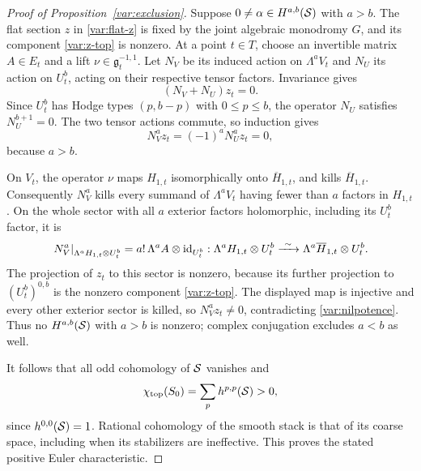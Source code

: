 \begin{proof}[Proof of Proposition~\ref{var:exclusion}]
Suppose $0\ne\alpha\in H^{a,b}(\mathcal S)$ with $a>b$.  The flat section
$z$ in \eqref{var:flat-z} is fixed by the joint algebraic monodromy
$G$, and its component \eqref{var:z-top} is nonzero.  At a point
$t\in T$, choose an invertible matrix $A\in E_t$ and a lift
$\nu\in\mathfrak g_t^{-1,1}$.  Let $N_V$ be its induced action on
$\Lambda^a V_t$ and $N_U$ its action on $U^b_t$, acting on their
respective tensor factors.  Invariance gives
\[
                         (N_V+N_U)z_t=0.
\]
Since $U^b_t$ has Hodge types $(p,b-p)$ with $0\le p\le b$, the
operator $N_U$ satisfies $N_U^{b+1}=0$.  The two tensor actions
commute, so induction gives
\begin{equation}
                    N_V^a z_t=(-1)^aN_U^a z_t=0,
 \label{var:nilpotence}
\end{equation}
because $a>b$.

On $V_t$, the operator $\nu$ maps $H_{1,t}$ isomorphically onto
$\overline H_{1,t}$, and kills $\overline H_{1,t}$.  Consequently
$N_V^a$ kills every summand of $\Lambda^a V_t$ having fewer than
$a$ factors in $H_{1,t}$.  On the whole sector with all $a$ exterior
factors holomorphic, including its $U^b_t$ factor, it is
\[
 \left.N_V^a\right|_{\Lambda^a H_{1,t}\otimes U^b_t}
   =a!\,\Lambda^a A\otimes\operatorname{id}_{U^b_t}:
 \Lambda^a H_{1,t}\otimes U^b_t
   \xrightarrow{\ \sim\ }
 \Lambda^a\overline H_{1,t}\otimes U^b_t.
\]
The projection of $z_t$ to this sector is nonzero, because its further
projection to $(U^b_t)^{0,b}$ is the nonzero component
\eqref{var:z-top}.  The displayed map is injective and every other
exterior sector is killed, so $N_V^a z_t\ne0$,
contradicting \eqref{var:nilpotence}.  Thus no $H^{a,b}(\mathcal S)$ with
$a>b$ is nonzero; complex conjugation excludes $a<b$ as well.

It follows that all odd cohomology of $\mathcal S$ vanishes and
\[
 \chi_{\mathrm{top}}(S_0)
     =\sum_p h^{p,p}(\mathcal S)>0,
\]
since $h^{0,0}(\mathcal S)=1$.  Rational cohomology of the smooth stack is
that of its coarse space, including when its stabilizers are
ineffective.  This proves the stated positive Euler characteristic.
\end{proof}
